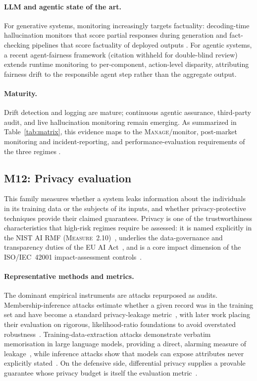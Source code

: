 \paragraph{LLM and agentic state of the art.} For generative systems, monitoring increasingly targets factuality: decoding-time hallucination monitors that score partial responses during generation \cite{monitoring2025hallucination} and fact-checking pipelines that score factuality of deployed outputs \cite{mitigating2025hallucination}. For agentic systems, a recent agent-fairness framework (citation withheld for double-blind review) extends runtime monitoring to per-component, action-level disparity, attributing fairness drift to the responsible agent step rather than the aggregate output.

\paragraph{Maturity.} Drift detection and logging are mature; continuous agentic assurance, third-party audit, and live hallucination monitoring remain emerging. As summarized in Table~\ref{tab:matrix}, this evidence maps to the \textsc{Manage}/monitor, post-market monitoring and incident-reporting, and performance-evaluation requirements of the three regimes \cite{nist2023airmf,euaiact2024,iso42001}.

\subsection{M12: Privacy evaluation}

This family measures whether a system leaks information about the individuals in its
training data or the subjects of its inputs, and whether privacy-protective techniques
provide their claimed guarantees. Privacy is one of the trustworthiness characteristics
that high-risk regimes require be assessed: it is named explicitly in the NIST AI RMF
(\textsc{Measure}~2.10)~\cite{nist2023airmf}, underlies the data-governance and
transparency duties of the EU AI Act~\cite{euaiact2024}, and is a core impact dimension of
the ISO/IEC~42001 impact-assessment controls~\cite{iso42001}.

\paragraph{Representative methods and metrics.} The dominant empirical instruments are
attacks repurposed as audits. Membership-inference attacks estimate whether a given record
was in the training set and have become a standard privacy-leakage
metric~\cite{shokri2017membership}, with later work placing their evaluation on rigorous,
likelihood-ratio foundations to avoid overstated robustness~\cite{carlini2022firstprinciples}.
Training-data-extraction attacks demonstrate verbatim memorisation in large language
models, providing a direct, alarming measure of leakage~\cite{carlini2021extracting}, while
inference attacks show that models can expose attributes never explicitly
stated~\cite{staab2023memorization}. On the defensive side, differential privacy supplies a
provable guarantee whose privacy budget is itself the evaluation
metric~\cite{abadi2016dp}.

